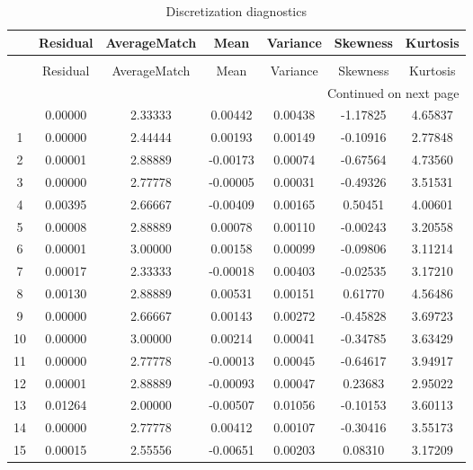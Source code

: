 \begin{longtable}{c c c c c c c}
\caption{Discretization diagnostics}
\label{tab:discret_diagn}\\
\toprule
{} & Residual & AverageMatch &     Mean &  Variance &  Skewness &  Kurtosis \\
\midrule
\endfirsthead
\caption[]{Discretization diagnostics} \\
\toprule
{} & Residual & AverageMatch &     Mean &  Variance &  Skewness &  Kurtosis \\
\midrule
\endhead
\midrule
\multicolumn{7}{r}{{Continued on next page}} \\
\midrule
\endfoot

\bottomrule
\endlastfoot
0   &  0.00000 &      2.33333 &  0.00442 &   0.00438 &  -1.17825 &   4.65837 \\
1   &  0.00000 &      2.44444 &  0.00193 &   0.00149 &  -0.10916 &   2.77848 \\
2   &  0.00001 &      2.88889 & -0.00173 &   0.00074 &  -0.67564 &   4.73560 \\
3   &  0.00000 &      2.77778 & -0.00005 &   0.00031 &  -0.49326 &   3.51531 \\
4   &  0.00395 &      2.66667 & -0.00409 &   0.00165 &   0.50451 &   4.00601 \\
5   &  0.00008 &      2.88889 &  0.00078 &   0.00110 &  -0.00243 &   3.20558 \\
6   &  0.00001 &      3.00000 &  0.00158 &   0.00099 &  -0.09806 &   3.11214 \\
7   &  0.00017 &      2.33333 & -0.00018 &   0.00403 &  -0.02535 &   3.17210 \\
8   &  0.00130 &      2.88889 &  0.00531 &   0.00151 &   0.61770 &   4.56486 \\
9   &  0.00000 &      2.66667 &  0.00143 &   0.00272 &  -0.45828 &   3.69723 \\
10  &  0.00000 &      3.00000 &  0.00214 &   0.00041 &  -0.34785 &   3.63429 \\
11  &  0.00000 &      2.77778 & -0.00013 &   0.00045 &  -0.64617 &   3.94917 \\
12  &  0.00001 &      2.88889 & -0.00093 &   0.00047 &   0.23683 &   2.95022 \\
13  &  0.01264 &      2.00000 & -0.00507 &   0.01056 &  -0.10153 &   3.60113 \\
14  &  0.00000 &      2.77778 &  0.00412 &   0.00107 &  -0.30416 &   3.55173 \\
15  &  0.00015 &      2.55556 & -0.00651 &   0.00203 &   0.08310 &   3.17209 \\

\end{longtable}
